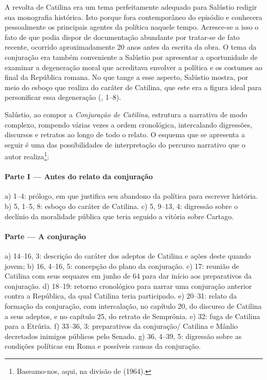 A revolta de Catilina era um tema perfeitamente adequado para Salústio redigir
sua monografia histórica. Isto porque fora contemporâneo do episódio e
conhecera pessoalmente os principais agentes da política naquele tempo.
Acresce-se a isso o fato de que podia dispor de documentação abundante por
tratar-se de fato recente, ocorrido aproximadamente 20 anos antes da escrita da
obra. O tema da conjuração era também conveniente a Salústio por apresentar a
oportunidade de examinar a degeneração moral que acreditava envolver a política
e os costumes ao final da República romana. No que tange a esse aspecto,
Salústio mostra, por meio do esboço que realiza do caráter de Catilina, que
este era a figura ideal para personificar essa degeneração (, 1--8).

Salústio, ao compor a \emph{Conjuração de Catilina}, estrutura a narrativa de modo
complexo, rompendo várias vezes a ordem cronológica, intercalando digressões,
discursos e retratos ao longo de todo o relato. O esquema que se apresenta a
seguir é uma das possibilidades de interpretação do percurso narrativo que o
autor realiza\footnote{Baseamo-nos, aqui, na divisão de  (1964).}:  

\paragraph{Parte I --- Antes do relato da conjuração}

a)	1--4: prólogo, em que justifica seu abandono da política para escrever
história.  b)	5, 1--5, 8: esboço do caráter de Catilina.  c)	5, 9--13, 4:
digressão sobre o declínio da moralidade pública que teria seguido a vitória
sobre Cartago. 

\paragraph{Parte  --- A conjuração}

a)	14--16, 3: descrição do caráter dos adeptos de Catilina e ações deste
quando jovem; b)	16, 4--16, 5: concepção do plano da conjuração.  c) 	17:
reunião de Catilina com seus sequazes em junho de 64 para dar início aos preparativos 
da conjuração.  d)	18--19: retorno cronológico para narrar uma conjuração
anterior contra a República, da qual Catilina teria participado.  e)	20--31:
relato da formação da conjuração, com intercalação, no capítulo 20, do discurso
de Catilina a seus adeptos, e no capítulo 25, do retrato de Semprônia.  e)
32:  fuga de Catilina para a Etrúria.  f)	33--36, 3: preparativos da
conjuração/ Catilina e Mânlio decretados inimigos públicos pelo Senado.  g)
36, 4--39, 5: digressão sobre as condições políticas em Roma e possíveis causas
da conjuração.	 	

